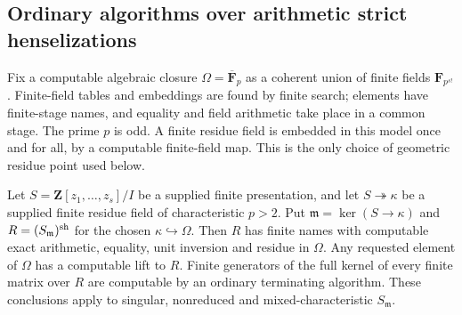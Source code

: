 \subsection{Ordinary algorithms over arithmetic strict henselizations}
\label{C:strict-henselization-subsection}

Fix a computable algebraic closure
$\Omega=\overline{\mathbf F}_p$ as a coherent union of finite
fields $\mathbf F_{p^{s!}}$.  Finite-field tables and embeddings
are found by finite search; elements have finite-stage names,
and equality and field arithmetic take place in a common stage.
The prime $p$ is odd.  A finite residue field is embedded in
this model once and for all, by a computable finite-field map.
This is the only choice of geometric residue point used below.

\begin{lemma}
\label{C:arithmetic-strict-henselization-access}
Let $S=\mathbf Z[z_1,\ldots,z_s]/I$ be a supplied finite
presentation, and let $S\twoheadrightarrow\kappa$ be a
supplied finite residue field of characteristic $p>2$.
Put $\mathfrak m=\ker(S\to\kappa)$ and
$R=(S_{\mathfrak m})^{\rm sh}$ for the chosen
$\kappa\hookrightarrow\Omega$.
Then $R$ has finite names with computable exact arithmetic,
equality, unit inversion and residue in $\Omega$.
Any requested element of $\Omega$ has a computable lift to
$R$.  Finite generators of the full kernel of every finite
matrix over $R$ are computable by an ordinary terminating
algorithm.  These conclusions apply to singular,
nonreduced and mixed-characteristic $S_{\mathfrak m}$.
\end{lemma}
